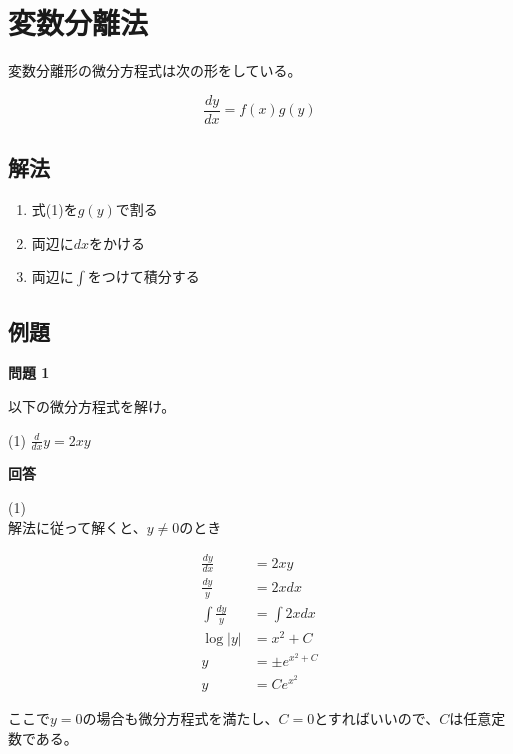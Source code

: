 \documentclass{jlreq}
\begin{document}
\section{変数分離法}
変数分離形の微分方程式は次の形をしている。

\begin{equation}
  \frac{dy}{dx} = f(x)g(y)
\end{equation}

\subsection{解法}
\begin{enumerate}
  \item 式(1)を$g(y)$で割る
  \item 両辺に$dx$をかける
  \item 両辺に$\int$をつけて積分する
\end{enumerate}

\subsection{例題}

\begin{tcolorbox}[enhanced,
  colback=white!85!gray,
  drop fuzzy shadow,
  boxrule=0.3mm,
  arc=0mm,
  left=0pt,
  top=0pt,
  sharp corners,
  width=\textwidth,
  ]
  \textbf{問題 1}

以下の微分方程式を解け。

(1) $\frac{d}{dx} y = 2 xy$
\tcblower

\begin{tcolorbox}[
  coltext=white!10!blue,
  colback=white!90!purple!90!blue,
  drop fuzzy shadow,
  boxrule=0mm,
  arc=0mm,
  width=1.3cm,
  left=0pt,
  right=0pt,
  top=0pt,
  bottom=0pt,
  halign=flush left,
]
\end{tcolorbox}
\tcblower
\textbf{回答}

(1) \\
解法に従って解くと、$y \neq 0$のとき

\begin{align*}
  \frac{dy}{dx} &= 2xy \\
  \frac{dy}{y} &= 2xdx \\
  \int \frac{dy}{y} &= \int 2xdx \\
  \log |y| &= x^2 + C \\
  y &= \pm e^{x^2 + C} \\
  y &= Ce^{x^2}
\end{align*}

ここで$y = 0$の場合も微分方程式を満たし、$C = 0$とすればいいので、$C$は任意定数である。

\end{tcolorbox}
\end{document}
